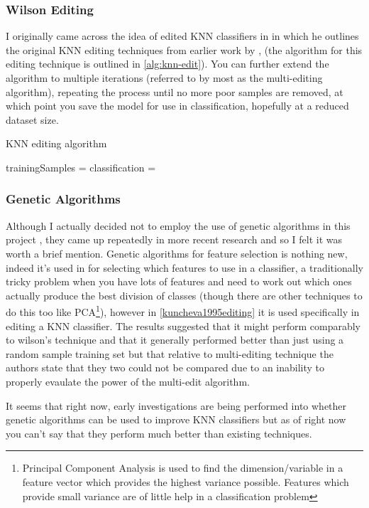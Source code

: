 \subsubsection{Wilson Editing}
I originally came across the idea of edited KNN classifiers in \cite{fujinaga1996adaptive} in which he outlines the original KNN editing techniques from earlier work by \cite{wilson1972asymptotic}, (the algorithm for this editing technique is outlined in \cref{alg:knn-edit}). You can further extend the algorithm to multiple iterations (referred to by most as the multi-editing algorithm), repeating the process until no more poor samples are removed, at which point you save the model for use in classification, hopefully at a reduced dataset size.

\begin{algorithm}[H]
  \caption{KNN editing algorithm}
  \label{alg:knn-edit}

  \begin{algorithmic}
        \State trainingSamples = 
          \State classification = 
          \EndIf
    	\EndFor
    \EndProcedure
  \end{algorithmic}
\end{algorithm}

\subsubsection{Genetic Algorithms}

Although I actually decided not to employ the use of genetic algorithms in this project , they came up repeatedly in more recent research and so I felt it was worth a brief mention. Genetic algorithms for feature selection is nothing new, indeed it's used in \cite{fujinaga1996adaptive} for selecting which features to use in a classifier, a traditionally tricky problem when you have lots of features and need to work out which ones actually produce the best division of classes (though there are other techniques to do this too like PCA\footnote{Principal Component Analysis is used to find the dimension/variable in a feature vector which provides the highest variance possible. Features which provide small variance are of little help in a classification problem}), however in \ref{kuncheva1995editing} it is used specifically in editing a KNN classifier. The results suggested that it might perform comparably to wilson's technique and that it generally performed better than just using a random sample training set but that relative to multi-editing technique the authors state that they two could not be compared due to an inability to properly evaulate the power of the multi-edit algorithm.

It seems that right now, early investigations are being performed into whether genetic algorithms can be used to improve KNN classifiers but as of right now you can't say that they perform much better than existing techniques.